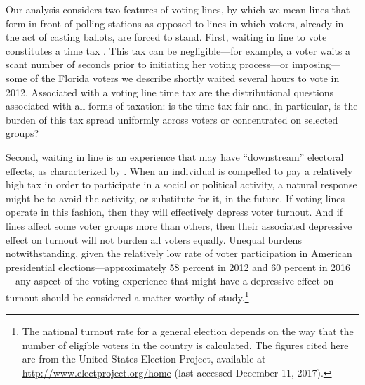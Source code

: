 \documentclass[12pt,titlepage]{article}
\begin{document}

Our analysis considers two features of voting lines, by which we mean
lines that form in front of polling stations as opposed to lines in
which voters, already in the act of casting ballots, are forced to
stand. First, waiting in line to vote constitutes a time tax
\citep{mukherjee:timetax}. This tax can be negligible---for example, a
voter waits a scant number of seconds prior to initiating her voting
process---or imposing---some of the Florida voters we describe shortly
waited several hours to vote in 2012. Associated with a voting line
time tax are the distributional questions associated with all forms of
taxation: is the time tax fair and, in particular, is the burden of
this tax spread uniformly across voters or concentrated on selected
groups?

Second, waiting in line is an experience that may have ``downstream''
electoral effects, as characterized by
\citet{pettigrew:longlinesminorityprecincts}. When an individual is
compelled to pay a relatively high tax in order to participate in a
social or political activity, a natural response might be to avoid the
activity, or substitute for it, in the future.  If voting lines
operate in this fashion, then they will effectively depress voter
turnout.  And if lines affect some voter groups more than others, then
their associated depressive effect on turnout will not burden all
voters equally.  Unequal burdens notwithstanding, given the relatively
low rate of voter participation in American presidential
elections---approximately 58 percent in 2012 and 60 percent in
2016---any aspect of the voting experience that might have a
depressive effect on turnout should be considered a matter worthy of
study.\footnote{The national turnout rate for a general election
  depends on the way that the number of eligible voters in the country
  is calculated.  The figures cited here are from the United States
  Election Project, available at
  \url{http://www.electproject.org/home} (last accessed December 11,
  2017).\label{fn:uselectionproject}}

\end{document}
